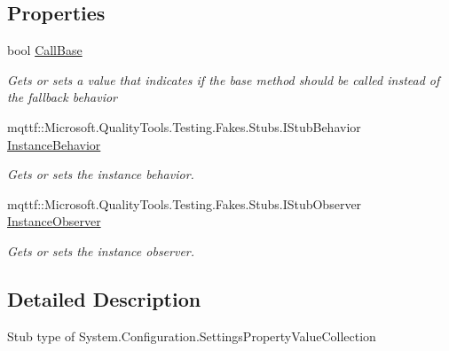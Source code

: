 \subsection*{Properties}
\begin{DoxyCompactItemize}
\item 
bool \hyperlink{class_system_1_1_configuration_1_1_fakes_1_1_stub_settings_property_value_collection_a5f01f6425b8286592b9246e1318c31fe}{Call\-Base}
\begin{DoxyCompactList}\small\item\em Gets or sets a value that indicates if the base method should be called instead of the fallback behavior\end{DoxyCompactList}\item 
mqttf\-::\-Microsoft.\-Quality\-Tools.\-Testing.\-Fakes.\-Stubs.\-I\-Stub\-Behavior \hyperlink{class_system_1_1_configuration_1_1_fakes_1_1_stub_settings_property_value_collection_a5acbc496e1167fb0d6f5b3a24275e8d6}{Instance\-Behavior}
\begin{DoxyCompactList}\small\item\em Gets or sets the instance behavior.\end{DoxyCompactList}\item 
mqttf\-::\-Microsoft.\-Quality\-Tools.\-Testing.\-Fakes.\-Stubs.\-I\-Stub\-Observer \hyperlink{class_system_1_1_configuration_1_1_fakes_1_1_stub_settings_property_value_collection_ac4c2d394e79443f97d1a9815ab31543e}{Instance\-Observer}
\begin{DoxyCompactList}\small\item\em Gets or sets the instance observer.\end{DoxyCompactList}\end{DoxyCompactItemize}


\subsection{Detailed Description}
Stub type of System.\-Configuration.\-Settings\-Property\-Value\-Collection



